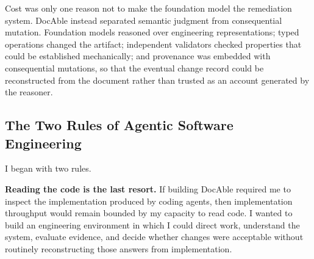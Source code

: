 
Cost was only one reason not to make the foundation model the remediation system. DocAble instead separated semantic judgment from consequential mutation. Foundation models reasoned over engineering representations; typed operations changed the artifact; independent validators checked properties that could be established mechanically; and provenance was embedded with consequential mutations, so that the eventual change record could be reconstructed from the document rather than trusted as an account generated by the reasoner.

\subsection{The Two Rules of Agentic Software Engineering}\label{heading:the-two-rules-of-agentic-software-engineering}


I began with two rules.

\textbf{Reading the code is the last resort.} If building DocAble required me to inspect the implementation produced by coding agents, then implementation throughput would remain bounded by my capacity to read code. I wanted to build an engineering environment in which I could direct work, understand the system, evaluate evidence, and decide whether changes were acceptable without routinely reconstructing those answers from implementation.


